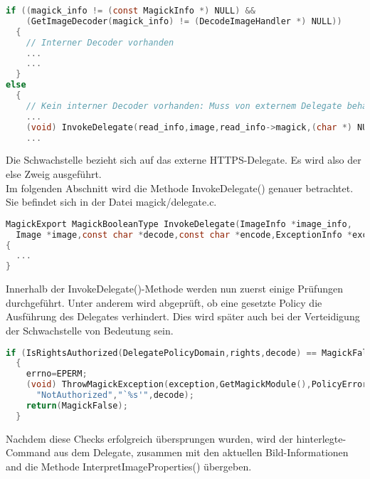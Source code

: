 \begin{lstlisting}[firstnumber=486, language=C, caption=magick/constitue.c Aufruf InvokeDelegate(),label={lst:}]
if ((magick_info != (const MagickInfo *) NULL) &&
    (GetImageDecoder(magick_info) != (DecodeImageHandler *) NULL))
  {
    // Interner Decoder vorhanden
    ...
    ...
  }
else
  {
    // Kein interner Decoder vorhanden: Muss von externem Delegate behandelt werden
    ...
    (void) InvokeDelegate(read_info,image,read_info->magick,(char *) NULL, exception);
    ...
\end{lstlisting}
\vspace{5mm}

Die Schwachstelle bezieht sich auf das externe HTTPS-Delegate.
Es wird also der else Zweig ausgeführt.\\

Im folgenden Abschnitt wird die Methode InvokeDelegate() genauer betrachtet.
Sie befindet sich in der Datei magick/delegate.c.

\begin{lstlisting}[firstnumber=1097, language=C, caption=magick/delegate.c InvokeDelegate(),label={lst:lstlisting}]
MagickExport MagickBooleanType InvokeDelegate(ImageInfo *image_info,
  Image *image,const char *decode,const char *encode,ExceptionInfo *exception)
{
  ...
}
\end{lstlisting}
\vspace{5mm}

Innerhalb der InvokeDelegate()-Methode werden nun zuerst einige Prüfungen durchgeführt.
Unter anderem wird abgeprüft, ob eine gesetzte Policy die Ausführung des Delegates verhindert.
Dies wird später auch bei der Verteidigung der Schwachstelle von Bedeutung sein.

\begin{lstlisting}[firstnumber=1129, language=C, caption=magick/delegates.c InvokeDelegate() Policy-Überprüfung,label={lst:delegatepolicy}]
if (IsRightsAuthorized(DelegatePolicyDomain,rights,decode) == MagickFalse)
  {
    errno=EPERM;
    (void) ThrowMagickException(exception,GetMagickModule(),PolicyError,
      "NotAuthorized","`%s'",decode);
    return(MagickFalse);
  }
\end{lstlisting}
\vspace{5mm}


Nachdem diese Checks erfolgreich übersprungen wurden, wird der hinterlegte-Command aus dem Delegate,
zusammen mit den aktuellen Bild-Informationen and die Methode InterpretImageProperties() übergeben.

